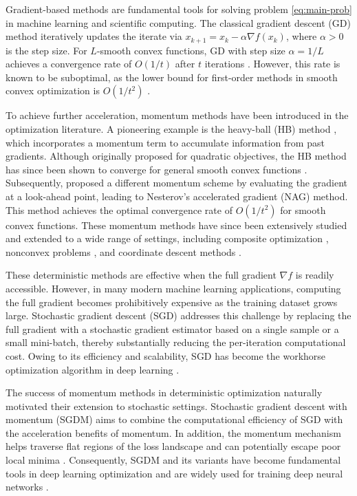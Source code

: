 \documentclass[10pt]{article}
\numberwithin{equation}{section}
\theoremstyle{definition}
\begin{document}
Gradient-based methods are fundamental tools for solving problem \eqref{eq:main-prob} in machine learning and scientific computing. The classical gradient descent (GD) method iteratively updates the iterate via $x_{k+1} = x_k - \alpha \nabla f(x_k)$, where $\alpha > 0$ is the step size. For $L$-smooth convex functions, GD with step size $\alpha = 1/L$ achieves a convergence rate of $O(1/t)$ after $t$ iterations \citep{nesterov2013introductory}. However, this rate is known to be suboptimal, as the lower bound for first-order methods in smooth convex optimization is $O(1/t^2)$ \citep{nemirovsky1983problem}.

To achieve further acceleration, momentum methods have been introduced in the optimization literature. A pioneering example is the heavy-ball (HB) method \citep{polyak1964some}, which incorporates a momentum term to accumulate information from past gradients. Although originally proposed for quadratic objectives, the HB method has since been shown to converge for general smooth convex functions \citep{ghadimi2015global}.
Subsequently, \citet{nesterov1983method} proposed a different momentum scheme by evaluating the gradient at a look-ahead point, leading to Nesterov's accelerated gradient (NAG) method. This method achieves the optimal convergence rate of $O(1/t^2)$ for smooth convex functions. These momentum methods have since been extensively studied and extended to a wide range of settings, including composite optimization \citep{beck2009fast, nesterov2013gradient}, nonconvex problems \citep{ochs2014ipiano}, and coordinate descent methods \citep{nesterov2012efficiency}.

These deterministic methods are effective when the full gradient $\nabla f$ is readily accessible. However, in many modern machine learning applications, computing the full gradient becomes prohibitively expensive as the training dataset grows large. Stochastic gradient descent (SGD) \citep{robbins1951stochastic} addresses this challenge by replacing the full gradient with a stochastic gradient estimator based on a single sample or a small mini-batch, thereby substantially reducing the per-iteration computational cost. Owing to its efficiency and scalability, SGD has become the workhorse optimization algorithm in deep learning \citep{bottou2018optimization,lecun2015deep,nguyen2019new,zhang2004solving}.

The success of momentum methods in deterministic optimization naturally motivated their extension to stochastic settings. Stochastic gradient descent with momentum (SGDM) aims to combine the computational efficiency of SGD with the acceleration benefits of momentum. In addition, the momentum mechanism helps traverse flat regions of the loss landscape and can potentially escape poor local minima \citep{ochs2015ipiasco}. Consequently, SGDM and its variants have become fundamental tools in deep learning optimization \citep{kingma2015adam,qian1999momentum,sutskever2013importance,yan2018unified} and are widely used for training deep neural networks \citep{he2016deep,simonyan2014very}.
\end{document}
